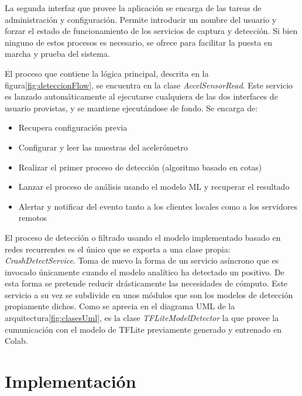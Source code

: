 La segunda interfaz que provee la aplicación se encarga de las tareas de administración y configuración. Permite introducir un nombre del usuario y forzar el estado de funcionamiento de los servicios de captura y detección. Si bien ninguno de estos procesos es necesario, se ofrece para facilitar la puesta en marcha y prueba del sistema.

El proceso que contiene la lógica principal, descrita en la figura\ref{fig:deteccionFlow}, se encuentra en la clase \textit{AccelSensorRead}. Este servicio es lanzado automáticamente al ejecutarse cualquiera de las dos interfaces de usuario provistas, y se mantiene ejecutándose de fondo. Se encarga de:

\begin{itemize}
  \item Recupera configuración previa
  \item Configurar y leer las muestras del acelerómetro
  \item Realizar el primer proceso de detección (algoritmo basado en cotas)
  \item Lanzar el proceso de análisis usando el modelo ML y recuperar el resultado
  \item Alertar y notificar del evento tanto a los clientes locales como a los servidores remotos
\end{itemize}

El proceso de detección o filtrado usando el modelo implementado basado en redes recurrentes es el único que se exporta a una clase propia: \textit{CrashDetectService}. Toma de nuevo la forma de un servicio asíncrono que es invocado únicamente cuando el modelo analítico ha detectado un positivo. De esta forma se pretende reducir drásticamente las necesidades de cómputo. Este servicio a su vez se subdivide en unos módulos que son los modelos de detección propiamente dichos. Como se aprecia en el diagrama UML de la arquitectura\ref{fig:clasesUml}, es la clase \textit{TFLiteModelDetector} la que provee la cumunicación con el modelo de TFLite previamente generado y entrenado en Colab.


\section{Implementación}\label{desc_impl}

